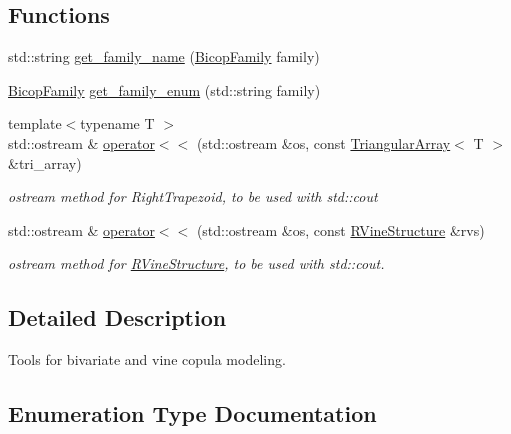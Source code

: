 \subsection*{Functions}
\begin{DoxyCompactItemize}
\item 
std\+::string \hyperlink{namespacevinecopulib_ac46553ae5f99072f65e9d3254d2c526d}{get\+\_\+family\+\_\+name} (\hyperlink{namespacevinecopulib_a42e95cc06d33896199caab0c11ad44f3}{Bicop\+Family} family)
\item 
\hyperlink{namespacevinecopulib_a42e95cc06d33896199caab0c11ad44f3}{Bicop\+Family} \hyperlink{namespacevinecopulib_a8d5285a58e0d250a5226715754e12568}{get\+\_\+family\+\_\+enum} (std\+::string family)
\item 
{\footnotesize template$<$typename T $>$ }\\std\+::ostream \& \hyperlink{namespacevinecopulib_a84bb80714f45441e76d85c7dd049db02}{operator$<$$<$} (std\+::ostream \&os, const \hyperlink{classvinecopulib_1_1_triangular_array}{Triangular\+Array}$<$ T $>$ \&tri\+\_\+array)
\begin{DoxyCompactList}\small\item\em ostream method for Right\+Trapezoid, to be used with {\ttfamily std\+::cout} \end{DoxyCompactList}\item 
std\+::ostream \& \hyperlink{namespacevinecopulib_a903371123a404c8736f5418da502b81c}{operator$<$$<$} (std\+::ostream \&os, const \hyperlink{classvinecopulib_1_1_r_vine_structure}{R\+Vine\+Structure} \&rvs)
\begin{DoxyCompactList}\small\item\em ostream method for \hyperlink{classvinecopulib_1_1_r_vine_structure}{R\+Vine\+Structure}, to be used with {\ttfamily std\+::cout}. \end{DoxyCompactList}\end{DoxyCompactItemize}


\subsection{Detailed Description}
Tools for bivariate and vine copula modeling. 

\subsection{Enumeration Type Documentation}
\mbox{\label{namespacevinecopulib_a42e95cc06d33896199caab0c11ad44f3}} 
